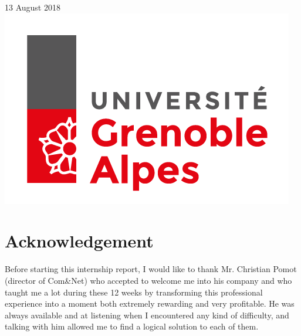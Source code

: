 \documentclass[12pt]{article}
\begin{document}
\begin{titlepage}
{\large 13 August 2018}\\[4cm] %


\includegraphics[scale=0.25]{logoUGA.png}\\[1cm] %
 

\vfill %

\end{titlepage}


\renewcommand{\contentsname}{Table of content}

\tableofcontents{}



\newpage
\section{Acknowledgement}

Before starting this internship report, I would like to thank Mr. Christian Pomot (director of Com\&Net) who accepted to welcome me into his company and who taught me a lot during these 12 weeks by transforming this professional experience into a moment both extremely rewarding and very profitable. He was always available and at listening when I encountered any kind of difficulty, and talking with him allowed me to find a logical solution to each of them.
\end{document}
